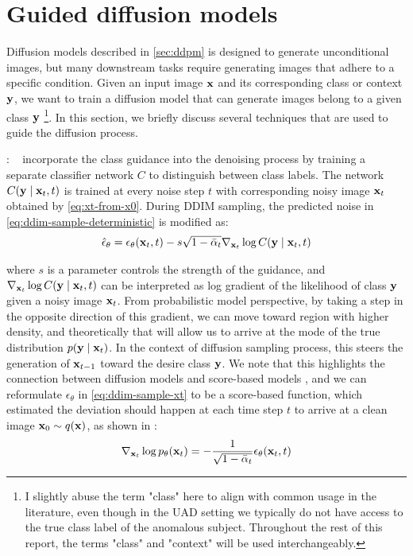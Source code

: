 \section{Guided diffusion models}
\label{sec:guided-dms}

Diffusion models described in \cref{sec:ddpm} is designed to generate unconditional images, but many downstream tasks require generating images that adhere to a specific condition. Given an input image ${\mathbf{x}}$ and its corresponding class or context ${\mathbf{y}}$, we want to train a diffusion model that can generate images belong to a given class ${\mathbf{y}}$ \footnote{I slightly abuse the term "class" here to align with common usage in the literature, even though in the UAD setting we typically do not have access to the true class label of the anomalous subject. Throughout the rest of this report, the terms "class" and "context" will be used interchangeably.}. In this section, we briefly discuss several techniques that are used to guide the diffusion process. 

: \citeauthor{dhariwalDiffusionModelsBeatGAN2021}~\cite{dhariwalDiffusionModelsBeatGAN2021} incorporate the class guidance into the denoising process by training a separate classifier network $C$ to distinguish between class labels. The network $C({\mathbf{y}} \mid {\mathbf{x}}_t, t)$ is trained at every noise step $t$ with corresponding noisy image ${\mathbf{x}}_t$ obtained by \cref{eq:xt-from-x0}. During DDIM sampling, the predicted noise in \cref{eq:ddim-sample-deterministic} is modified as: 
\begin{align}
    \hat{\epsilon}_{\theta} = \epsilon_{\theta} ({\mathbf{x}}_t, t) - s \sqrt{1 - \bar\alpha_t} \nabla_{{\mathbf{x}}_t} \log C({\mathbf{y}} \mid {\mathbf{x}}_t, t) \label{eq:class-guide-epsilon}
\end{align}

where $s$ is a parameter controls the strength of the guidance, and $\nabla_{{\mathbf{x}}_t} \log C({\mathbf{y}} \mid {\mathbf{x}}_t, t)$ can be interpreted as log gradient of the likelihood of class ${\mathbf{y}}$ given a noisy image ${\mathbf{x}}_t$. From probabilistic model perspective, by taking a step in the opposite direction of this gradient, we can move toward region with higher density, and theoretically that will allow us to arrive at the mode of the true distribution $p({\mathbf{y}} \mid {\mathbf{x}}_t)$. In the context of diffusion sampling process, this steers the generation of ${\mathbf{x}}_{t-1}$ toward the desire class ${\mathbf{y}}$. We note that this highlights the connection between diffusion models and score-based models \cite{songScoreBasedGenerativeModeling2021}, and we can reformulate $\epsilon_{\theta}$ in \cref{eq:ddim-sample-xt} to be a score-based function, which estimated the deviation should happen at each time step $t$ to arrive at a clean image ${\mathbf{x}}_0 \sim q({\mathbf{x}})$, as shown in \cite{DDAD, luoUnderstandingDiffusionModels2022}: 
\begin{align}
    \nabla_{{\mathbf{x}}_t} \log p_{\theta} ({\mathbf{x}}_t) = - \frac{1}{\sqrt{1 - \bar{\alpha}_t}} \epsilon_{\theta} ({\mathbf{x}}_t, t) \label{eq:connection-epsilon-score-func}
\end{align}

